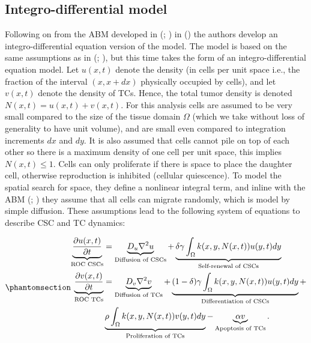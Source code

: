 \documentclass[
  letterpaper,
]{scrreprt}
\theoremstyle{definition}
\theoremstyle{remark}
\begin{document}
\subsection{Integro-differential
model}\label{sec-integro-differential-model}

Following on from the ABM developed in
(;
) in
() the
authors develop an integro-differential equation version of the model.
The model is based on the same assumptions as in
(;
), but this time takes the form
of an integro-differential equation model. Let \(u(x,t)\) denote the
density (in cells per unit space i.e., the fraction of the interval
\((x,x+dx)\) physically occupied by cells), and let \(v(x,t)\) denote
the density of TCs. Hence, the total tumor density is denoted
\(N(x,t) = u(x,t) + v(x,t)\). For this analysis cells are assumed to be
very small compared to the size of the tissue domain \(\Omega\) (which
we take without loss of generality to have unit volume), and are small
even compared to integration increments \(dx\) and \(dy\). It is also
assumed that cells cannot pile on top of each other so there is a
maximum density of one cell per unit space, this implies
\(N(x,t) \leq 1\). Cells can only proliferate if there is space to place
the daughter cell, otherwise reproduction is inhibited (cellular
quiescence). To model the spatial search for space, they define a
nonlinear integral term, and inline with the ABM
(;
) they assume that all cells can
migrate randomly, which is model by simple diffusion. These assumptions
lead to the following system of equations to describe CSC and TC
dynamics:

\begin{equation}\phantomsection\label{eq-integro-differential-CSC-model}{
\begin{aligned}
    \underbrace{\frac{\partial u(x,t)}{\partial t}}_\text{ROC CSCs} &= \underbrace{D_u \nabla^2 u}_\text{Diffusion of CSCs} + \underbrace{\delta \gamma \int_{\Omega} k(x,y,N(x,t))u(y,t) dy}_\text{Self-renewal of CSCs} \\
    \underbrace{\frac{\partial v(x,t)}{\partial t}}_\text{ROC TCs} &= \underbrace{D_v \nabla^2 v}_\text{Diffusion of TCs} + \underbrace{(1-\delta) \gamma \int_{\Omega} k(x,y,N(x,t))u(y,t) dy}_\text{Differentiation of CSCs} + \\
    & \underbrace{\rho \int_{\Omega} k(x,y,N(x,t))v(y,t) dy}_\text{Proliferation of TCs} - \underbrace{\alpha v}_\text{Apoptosis of TCs}.
\end{aligned}
}\end{equation}
\end{document}
